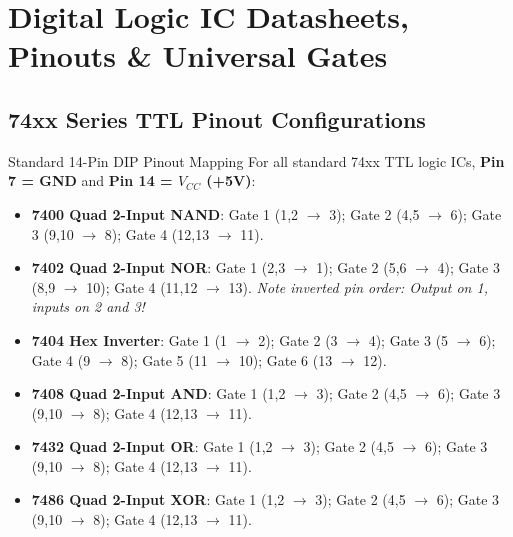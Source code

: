 \chapter{Digital Logic IC Datasheets, Pinouts \& Universal Gates}

\section{74xx Series TTL Pinout Configurations}
\begin{formulabox}{Standard 14-Pin DIP Pinout Mapping}
For all standard 74xx TTL logic ICs, \textbf{Pin 7 = GND} and \textbf{Pin 14 = $V_{CC}$ (+5V)}:
\begin{itemize}
    \item \textbf{7400 Quad 2-Input NAND}: Gate 1 (1,2 $\to$ 3); Gate 2 (4,5 $\to$ 6); Gate 3 (9,10 $\to$ 8); Gate 4 (12,13 $\to$ 11).
    \item \textbf{7402 Quad 2-Input NOR}: Gate 1 (2,3 $\to$ 1); Gate 2 (5,6 $\to$ 4); Gate 3 (8,9 $\to$ 10); Gate 4 (11,12 $\to$ 13). \textit{Note inverted pin order: Output on 1, inputs on 2 and 3!}
    \item \textbf{7404 Hex Inverter}: Gate 1 (1 $\to$ 2); Gate 2 (3 $\to$ 4); Gate 3 (5 $\to$ 6); Gate 4 (9 $\to$ 8); Gate 5 (11 $\to$ 10); Gate 6 (13 $\to$ 12).
    \item \textbf{7408 Quad 2-Input AND}: Gate 1 (1,2 $\to$ 3); Gate 2 (4,5 $\to$ 6); Gate 3 (9,10 $\to$ 8); Gate 4 (12,13 $\to$ 11).
    \item \textbf{7432 Quad 2-Input OR}: Gate 1 (1,2 $\to$ 3); Gate 2 (4,5 $\to$ 6); Gate 3 (9,10 $\to$ 8); Gate 4 (12,13 $\to$ 11).
    \item \textbf{7486 Quad 2-Input XOR}: Gate 1 (1,2 $\to$ 3); Gate 2 (4,5 $\to$ 6); Gate 3 (9,10 $\to$ 8); Gate 4 (12,13 $\to$ 11).
\end{itemize}
\end{formulabox}

